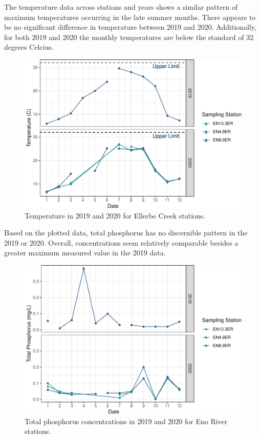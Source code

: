 \documentclass[
  12pt,
]{article}
\begin{document}
The temperature data across stations and years shows a similar pattern
of maximum temperatures occurring in the late summer months. There
appears to be no significant difference in temperature between 2019 and
2020. Additionally, for both 2019 and 2020 the monthly temperatures are
below the standard of 32 degrees Celcius.

\begin{figure}
\centering
\includegraphics{August_Lindborg_ENV872_Project_files/figure-latex/unnamed-chunk-8-1.pdf}
\caption{Temperature in 2019 and 2020 for Ellerbe Creek stations.}
\end{figure}

Based on the plotted data, total phosphorus has no discernible pattern
in the 2019 or 2020. Overall, concentrations seem relatively comparable
besides a greater maximum measured value in the 2019 data.

\begin{figure}
\centering
\includegraphics{August_Lindborg_ENV872_Project_files/figure-latex/unnamed-chunk-9-1.pdf}
\caption{Total phosphorus concentrations in 2019 and 2020 for Eno River
stations.}
\end{figure}
\end{document}
